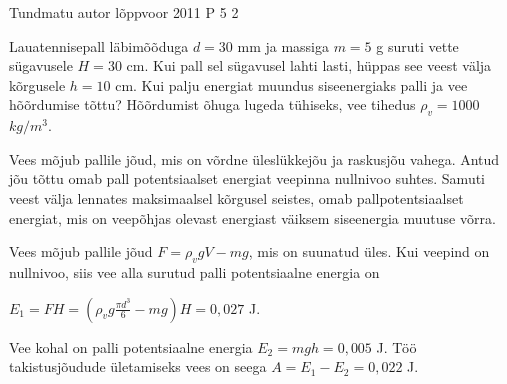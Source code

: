 {Tundmatu autor} %
{lõppvoor} %
{2011} %
{P 5} %
{2} %
{

\ifStatement
Lauatennisepall läbimõõduga $d = 30$ mm ja massiga $m = 5$ g suruti vette sügavusele $H = 30$ cm. Kui pall sel sügavusel lahti lasti, hüppas see veest välja kõrgusele $h = 10$ cm. Kui palju energiat muundus siseenergiaks palli ja vee hõõrdumise tõttu? Hõõrdumist õhuga lugeda tühiseks, vee tihedus $\rho_v = 1000$ $kg/m^3$.
\fi

\ifHint
Vees mõjub pallile jõud, mis on võrdne üleslükkejõu ja raskusjõu vahega. Antud jõu tõttu omab pall potentsiaalset energiat veepinna nullnivoo suhtes. Samuti veest välja lennates maksimaalsel kõrgusel seistes, omab pallpotentsiaalset energiat, mis on veepõhjas olevast energiast väiksem siseenergia muutuse võrra.
\fi


\ifSolution
Vees mõjub pallile jõud $F = \rho_vgV − mg$, mis on suunatud üles. Kui veepind on nullnivoo, siis vee alla surutud palli potentsiaalne energia on
\begin{center}
$E_1 = FH =  (\rho_vg \frac{\pi d^3}{6} - mg) H = 0,027$ J.
\end{center}
Vee kohal on palli potentsiaalne energia $E_2 = mgh = 0,005$ J. Töö takistusjõudude ületamiseks vees on seega $A = E_1 - E_2 = 0,022$ J.
\fi
}